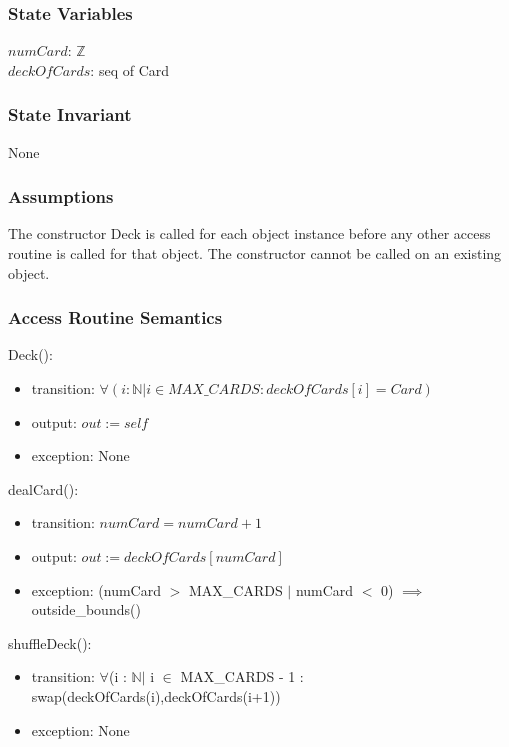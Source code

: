 \documentclass[12pt]{article}
\begin{document}
\subsubsection* {State Variables}

$numCard$: $\mathbb{Z}$ \\
$deckOfCards$: seq of Card

\subsubsection* {State Invariant}

None

\subsubsection* {Assumptions}

The constructor Deck is called for each object instance before any other
access routine is called for that object.  The constructor cannot be called on
an existing object.

\subsubsection* {Access Routine Semantics}

Deck():
\begin{itemize}
\item transition: $\forall (i : \mathbb{N} | i \in MAX\_CARDS: deckOfCards[i] = Card)$
\item output: $out := \mathit{self}$
\item exception: None
\end{itemize}

\noindent dealCard():
\begin{itemize}
\item transition: $numCard = numCard + 1$
\item output: $out := deckOfCards[numCard]$
\item exception:  (numCard $>$ MAX\_CARDS $|$  numCard $<$ 0) $\implies$ outside\_bounds()
\end{itemize}

\noindent shuffleDeck():
\begin{itemize}
\item transition: $\forall$(i : $\mathbb{N} |$ i $\in$ MAX\_CARDS - 1 : swap(deckOfCards(i),deckOfCards(i+1))
\item exception: None
\end{itemize}
\end{document}
